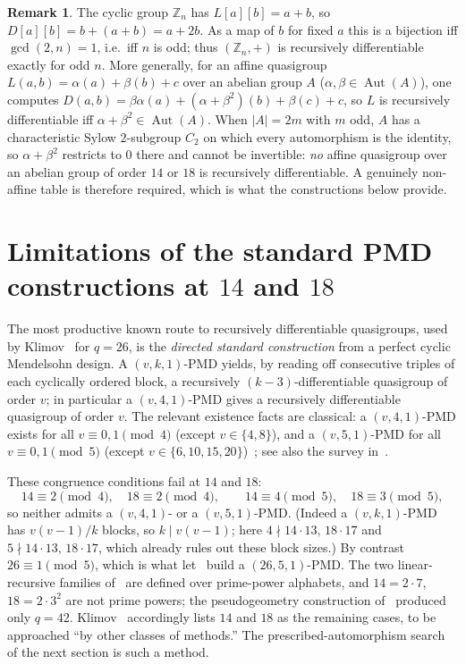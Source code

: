 \documentclass[11pt]{article}
\theoremstyle{definition}
\newtheorem{remark}[theorem]{Remark}
\begin{document}
\begin{remark}\label{rem:linear}
The cyclic group $\mathbb{Z}_n$ has $L[a][b]=a+b$, so $D[a][b]=b+(a+b)=a+2b$. As a map of
$b$ for fixed $a$ this is a bijection iff $\gcd(2,n)=1$, i.e.\ iff $n$ is odd; thus
$(\mathbb{Z}_n,+)$ is recursively differentiable exactly for odd $n$. More generally, for
an affine quasigroup $L(a,b)=\alpha(a)+\beta(b)+c$ over an abelian group $A$
($\alpha,\beta\in\operatorname{Aut}(A)$), one computes
$D(a,b)=\beta\alpha(a)+(\alpha+\beta^2)(b)+\beta(c)+c$, so $L$ is recursively
differentiable iff $\alpha+\beta^2\in\operatorname{Aut}(A)$. When $|A|=2m$ with $m$ odd,
$A$ has a characteristic Sylow $2$-subgroup $C_2$ on which every automorphism is the
identity, so $\alpha+\beta^2$ restricts to $0$ there and cannot be invertible: \emph{no}
affine quasigroup over an abelian group of order $14$ or $18$ is recursively
differentiable. A genuinely non-affine table is therefore required, which is what the
constructions below provide.
\end{remark}

\section{\texorpdfstring{Limitations of the standard PMD constructions at $14$ and $18$}
{Limitations of the standard PMD constructions at 14 and 18}}\label{sec:obstruction}

The most productive known route to recursively differentiable quasigroups, used by
Klimov~\cite{Klimov} for $q=26$, is the \emph{directed standard construction} from a
perfect cyclic Mendelsohn design. A $(v,k,1)$-PMD yields, by reading off consecutive
triples of each cyclically ordered block, a recursively $(k-3)$-differentiable quasigroup
of order $v$; in particular a $(v,4,1)$-PMD gives a recursively differentiable quasigroup
of order $v$. The relevant existence facts are classical:
a $(v,4,1)$-PMD exists for all $v\equiv 0,1 \pmod 4$ (except $v\in\{4,8\}$), and a
$(v,5,1)$-PMD for all $v\equiv 0,1 \pmod 5$ (except $v\in\{6,10,15,20\}$)~\cite{Mendelsohn};
see also the survey in~\cite{Klimov}.

These congruence conditions fail at $14$ and $18$:
\[
  14\equiv 2 \pmod 4,\quad 18\equiv 2 \pmod 4,\qquad
  14\equiv 4 \pmod 5,\quad 18\equiv 3 \pmod 5,
\]
so neither admits a $(v,4,1)$- or a $(v,5,1)$-PMD. (Indeed a $(v,k,1)$-PMD has
$v(v-1)/k$ blocks, so $k\mid v(v-1)$; here $4\nmid 14\cdot 13,\,18\cdot 17$ and
$5\nmid 14\cdot 13,\,18\cdot 17$, which already rules out these block sizes.) By contrast
$26\equiv 1\pmod 5$, which is what let~\cite{Klimov} build a $(26,5,1)$-PMD. The two
linear-recursive families of~\cite{Klimov} are defined over prime-power alphabets, and
$14=2\cdot 7$, $18=2\cdot 3^2$ are not prime powers; the pseudogeometry construction
of~\cite{MNST} produced only $q=42$. Klimov~\cite{Klimov} accordingly lists $14$ and $18$
as the remaining cases, to be approached ``by other classes of methods.'' The
prescribed-automorphism search of the next section is such a method.
\end{document}

